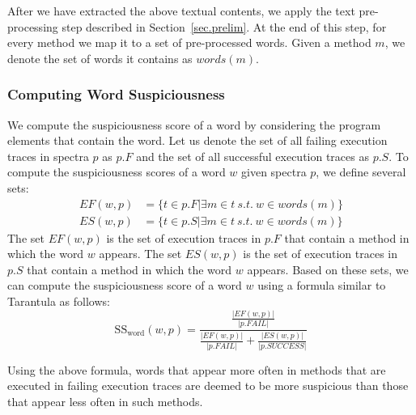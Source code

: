 After we have extracted the above textual contents, we apply the text pre-processing step described in Section~\ref{sec.prelim}. At the end of this step, for every method we map it to a set of pre-processed words. Given a method $m$, we denote the set of words it contains as $words(m)$.

\subsubsection{Computing Word Suspiciousness}
We compute the suspiciousness score of a word by considering the program elements that contain the word. Let us denote the set of all failing execution traces in spectra $p$ as $p.F$ and the set of all successful execution traces as $p.S$. To compute the suspiciousness scores of a word $w$ given spectra $p$, we define several sets:
\begin{align*}
EF(w,p) &= \{t \in p.F | \exists {m\in t}~s.t.~w\in words(m)\}\nonumber\\
ES(w,p) &= \{t \in p.S | \exists {m\in t}~s.t.~w\in words(m)\}\nonumber
\end{align*}
The set $EF(w,p)$ is the set of execution traces in $p.F$ that contain a method in which the word $w$ appears. The set $ES(w,p)$ is the set of execution traces in $p.S$ that contain a method in which the word $w$ appears. Based on these sets, we can compute the suspiciousness score of a word $w$ using a formula similar to Tarantula as follows:
\begin{equation}
\text{SS}_{\text{word}}(w,p)=\frac{\frac{|EF(w,p)|}{|p.FAIL|}}{\frac{|EF(w,p)|}{|p.FAIL|}+\frac{|ES(w,p)|}{|p.SUCCESS|}}
\label{eq:ss}
\end{equation}

Using the above formula, words that appear more often in methods that are executed in failing execution traces are deemed to be more suspicious than those that appear less often in such methods.


